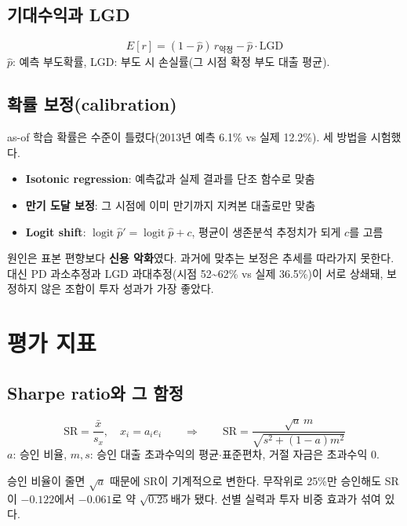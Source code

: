 \section{기대수익과 LGD}
\begin{formulabox}[연 기대수익(근사)]
\[ E[r]=(1-\hat p)\,r_{\text{약정}}-\hat p\cdot\mathrm{LGD} \]
$\hat p$: 예측 부도확률, LGD: 부도 시 손실률(그 시점 확정 부도 대출 평균).
\end{formulabox}

\section{확률 보정(calibration)}
as-of 학습 확률은 수준이 틀렸다(2013년 예측 6.1\% vs 실제 12.2\%). 세 방법을 시험했다.
\begin{itemize}
\item \textbf{Isotonic regression}: 예측값과 실제 결과를 단조 함수로 맞춤
\item \textbf{만기 도달 보정}: 그 시점에 이미 만기까지 지켜본 대출로만 맞춤
\item \textbf{Logit shift}: $\operatorname{logit}\hat p'=\operatorname{logit}\hat p+c$, 평균이 생존분석 추정치가 되게 $c$를 고름
\end{itemize}
\begin{warnbox}[결과: 모두 실패]
원인은 표본 편향보다 \textbf{신용 악화}였다. 과거에 맞추는 보정은 추세를 따라가지 못한다. 대신 PD 과소추정과 LGD 과대추정(시점 52\textasciitilde 62\% vs 실제 36.5\%)이 서로 상쇄돼, 보정하지 않은 조합이 투자 성과가 가장 좋았다.
\end{warnbox}

\chapter{평가 지표}

\section{Sharpe ratio와 그 함정}
\begin{formulabox}
\[ \mathrm{SR}=\frac{\bar x}{s_x},\quad x_i=a_i e_i \qquad\Longrightarrow\qquad
\mathrm{SR}=\frac{\sqrt a\, m}{\sqrt{s^2+(1-a)m^2}} \]
$a$: 승인 비율, $m,s$: 승인 대출 초과수익의 평균\ensuremath{\cdot}표준편차, 거절 자금은 초과수익 0.
\end{formulabox}
\begin{whybox}[역U자의 정체]
승인 비율이 줄면 $\sqrt a$ 때문에 SR이 기계적으로 변한다. 무작위로 25\%만 승인해도 SR이 $-0.122$에서 $-0.061$로 약 $\sqrt{0.25}$배가 됐다. 선별 실력과 투자 비중 효과가 섞여 있다.
\end{whybox}

